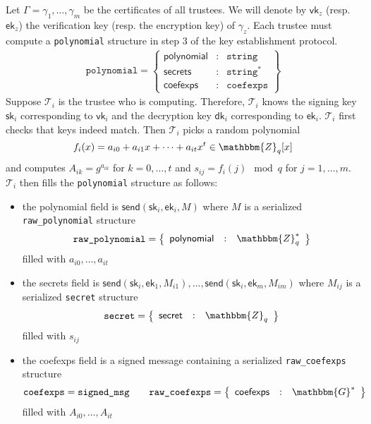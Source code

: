 \documentclass[a4paper]{article}
\newcommand{\G}{\mathbbm{G}}
\newcommand{\Z}{\mathbbm{Z}}
\newcommand{\jstring}{\texttt{string}}
\begin{document}
Let $\Gamma=\gamma_1,\dotsc,\gamma_m$ be the certificates of all
trustees. We will denote by $\textsf{vk}_z$ (resp. $\textsf{ek}_z$)
the \textsf{verification} key (resp. the \textsf{encryption} key) of
$\gamma_z$. Each trustee must compute a \texttt{polynomial} structure
in step 3 of the key establishment protocol.
\begin{gather*}
  \texttt{polynomial}=\left\{
    \begin{array}{rcl}
      \textsf{polynomial}&:&\jstring\\
      \textsf{secrets}&:&\jstring^\ast\\
      \textsf{coefexps}&:&\texttt{coefexps}
    \end{array}
  \right\}
\end{gather*}
Suppose $\mathcal{T}_i$ is the trustee who is computing. Therefore, $\mathcal{T}_i$ knows
the signing key $\textsf{sk}_i$ corresponding to $\textsf{vk}_i$ and the
decryption key $\textsf{dk}_i$ corresponding to $\textsf{ek}_i$. $\mathcal{T}_i$
first checks that keys indeed match. Then $\mathcal{T}_i$ picks a random
polynomial
\[
  f_i(x)=a_{i0}+a_{i1}x+\dotsb+a_{it}x^t\in\Z_q[x]
\]
and computes $A_{ik}=g^{a_{ik}}$ for $k=0,\dotsc,t$ and
$s_{ij}=f_i(j)\mod q$ for $j=1,\dotsc,m$. $\mathcal{T}_i$ then fills the
\texttt{polynomial} structure as follows:
\begin{itemize}
\item the \textsf{polynomial} field is
  $\textsf{send}(\textsf{sk}_i,\textsf{ek}_i,M)$ where $M$ is a
  serialized \texttt{raw\_polynomial} structure
  \begin{gather*}
    \texttt{raw\_polynomial}=\left\{
      \begin{array}{rcl}
        \textsf{polynomial}&:&\Z_q^\ast
      \end{array}
    \right\}
  \end{gather*}
  filled with $a_{i0},\dotsc,a_{it}$
\item the \textsf{secrets} field is
  $\textsf{send}(\textsf{sk}_i,\textsf{ek}_1,M_{i1}),\dotsc,\textsf{send}(\textsf{sk}_i,\textsf{ek}_m,M_{im})$
  where $M_{ij}$ is a serialized \texttt{secret} structure
  \begin{gather*}
    \texttt{secret}=\left\{
      \begin{array}{rcl}
        \textsf{secret}&:&\Z_q
      \end{array}
    \right\}
  \end{gather*}
  filled with $s_{ij}$
\item the \textsf{coefexps} field is a signed message containing a
  serialized \texttt{raw\_coefexps} structure
  \begin{gather*}
    \texttt{coefexps}=\texttt{signed\_msg}
    \qquad
    \texttt{raw\_coefexps}=\left\{
      \begin{array}{rcl}
        \textsf{coefexps}&:&\G^\ast
      \end{array}
    \right\}
  \end{gather*}
  filled with $A_{i0},\dotsc,A_{it}$
\end{itemize}
\end{document}
